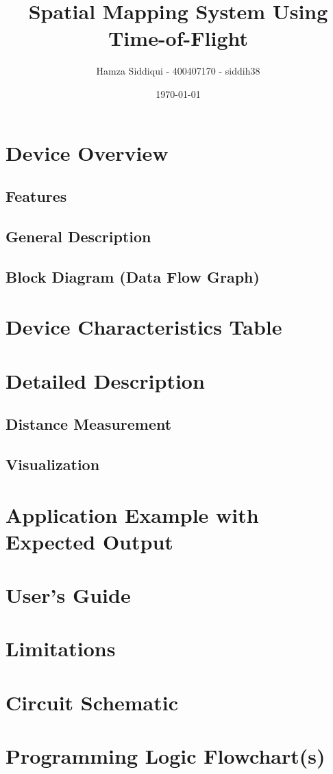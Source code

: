 \documentclass[12pt, letterpaper]{article}
\title{Spatial Mapping System Using Time-of-Flight}
\author{Hamza Siddiqui - 400407170 - siddih38 }
\date{\today}
\begin{document}
\maketitle
\thispagestyle{fancy}

\newpage
\section{Device Overview}
\subsection{Features}
\subsection{General Description}
\subsection{Block Diagram (Data Flow Graph)}
\section{Device Characteristics Table}
\section{Detailed Description}
\subsection{Distance Measurement}
\subsection{Visualization}
\section{Application Example with Expected Output}
\section{User's Guide}
\section{Limitations}
\section{Circuit Schematic}
\section{Programming Logic Flowchart(s)}
\end{document}
